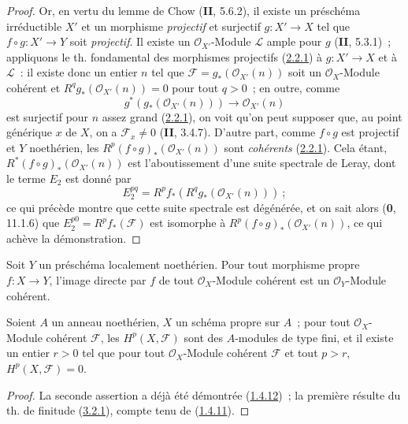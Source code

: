 \begin{proof}
Or, en vertu du lemme de Chow (\textbf{II}, 5.6.2), il existe un préschéma
irréductible $X'$ et un morphisme \emph{projectif} et surjectif
$g:X'\to X$ tel que $f\circ g:X'\to Y$ soit \emph{projectif}. Il existe un
$\mathcal O_{X'}$-Module $\mathcal L$ ample pour $g$ (\textbf{II}, 5.3.1)~;
appliquons le th. fondamental des morphismes projectifs
(\hyperref[III.2.2.1-fr]{2.2.1}) à $g:X'\to X$ et à $\mathcal L$~: il
existe donc un entier $n$ tel que
$\mathcal F=g_*(\mathcal O_{X'}(n))$ soit un $\mathcal O_X$-Module cohérent
et $R^qg_*(\mathcal O_{X'}(n))=0$ pour tout $q>0$~; en outre, comme
\[
g^*(g_*(\mathcal O_{X'}(n)))\longrightarrow\mathcal O_{X'}(n)
\]
est surjectif pour $n$ assez grand (\hyperref[III.2.2.1-fr]{2.2.1}), on
voit qu'on peut supposer que, au point générique $x$ de $X$, on a
$\mathcal F_x\neq0$ (\textbf{II}, 3.4.7). D'autre part, comme $f\circ g$ est
projectif et $Y$ noethérien, les
$R^p(f\circ g)_*(\mathcal O_{X'}(n))$ sont \emph{cohérents}
(\hyperref[III.2.2.1-fr]{2.2.1}). Cela étant,
$R^*(f\circ g)_*(\mathcal O_{X'}(n))$ est l'aboutissement d'une suite
spectrale de Leray, dont le terme $E_2$ est donné par
\[
E_2^{pq}=R^pf_*(R^qg_*(\mathcal O_{X'}(n)))~;
\]
ce qui précède montre que cette suite spectrale est dégénérée, et on sait
alors (\textbf{0}, 11.1.6) que $E_2^{p0}=R^pf_*(\mathcal F)$ est isomorphe à
$R^p(f\circ g)_*(\mathcal O_{X'}(n))$, ce qui achève la démonstration.
\end{proof}

\begin{corollary}[3.2.2]
\label{III.3.2.2-fr}
Soit $Y$ un préschéma localement noethérien. Pour tout morphisme propre
$f:X\to Y$, l'image directe par $f$ de tout $\mathcal O_X$-Module cohérent
est un $\mathcal O_Y$-Module cohérent.
\end{corollary}

\begin{corollary}[3.2.3]
\label{III.3.2.3-fr}
Soient $A$ un anneau noethérien, $X$ un schéma propre sur $A$~; pour tout
$\mathcal O_X$-Module cohérent $\mathcal F$, les $H^p(X,\mathcal F)$ sont
des $A$-modules de type fini, et il existe un entier $r>0$ tel que pour tout
$\mathcal O_X$-Module cohérent $\mathcal F$ et tout $p>r$,
$H^p(X,\mathcal F)=0$.
\end{corollary}

\begin{proof}
La seconde assertion a déjà été démontrée
(\hyperref[III.1.4.12-fr]{1.4.12})~; la première résulte du th. de finitude
(\hyperref[III.3.2.1-fr]{3.2.1}), compte tenu de
(\hyperref[III.1.4.11-fr]{1.4.11}).
\end{proof}

